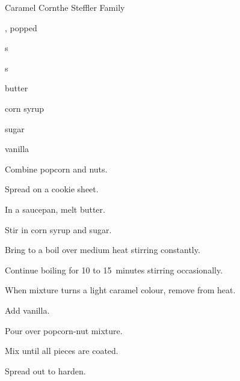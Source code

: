 \begin{recipe}{Caramel Corn}{the Steffler Family}{}

\begin{ingredients}
\item {} , popped 
\item \C{\half} s
\item \C{\half} s
\item \C{\half} butter
\item \C{\quarter} corn syrup
\item \C{\twothird} sugar
\item {} vanilla
\end{ingredients}

\begin{directions}
\item Combine popcorn and nuts.
\item Spread on a cookie sheet.
\item In a saucepan, melt butter.
\item Stir in corn syrup and sugar.
\item Bring to a boil over medium heat stirring constantly.
\item Continue boiling for 10 to 15~minutes stirring occasionally.
\item When mixture turns a light caramel colour, remove from heat.
\item Add vanilla.
\item Pour over popcorn-nut mixture.
\item Mix until all pieces are coated.
\item Spread out to harden.
\end{directions}
\end{recipe}

